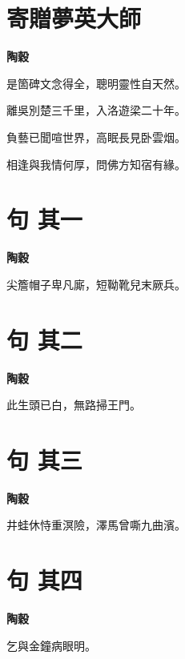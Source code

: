 \documentclass[12pt,a4paper]{ctexbook}
\begin{document}
\section{寄贈夢英大師}
\textbf{陶穀}\par\vspace{0.5em}
是箇碑文念得全，聰明靈性自天然。\par
離吳別楚三千里，入洛遊梁二十年。\par
負藝已聞喧世界，高眠長見卧雲烟。\par
相逢與我情何厚，問佛方知宿有緣。\par

\section{句  其一}
\textbf{陶穀}\par\vspace{0.5em}
尖簷帽子卑凡廝，短靿靴兒末厥兵。\par

\section{句  其二}
\textbf{陶穀}\par\vspace{0.5em}
此生頭已白，無路掃王門。\par

\section{句  其三}
\textbf{陶穀}\par\vspace{0.5em}
井蛙休恃重溟險，澤馬曾嘶九曲濱。\par

\section{句  其四}
\textbf{陶穀}\par\vspace{0.5em}
乞與金鐘病眼明。\par
\end{document}
